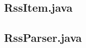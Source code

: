 \documentclass[a4paper, 12pt]{article}
\begin{document}
\newpage
\subsection{RssItem.java}\label{RssItem.java}
\begin{footnotesize}
  
\end{footnotesize}

\newpage
\subsection{RssParser.java}\label{RssParser.java}
\begin{footnotesize}
  
\end{footnotesize}
  
\end{document}

